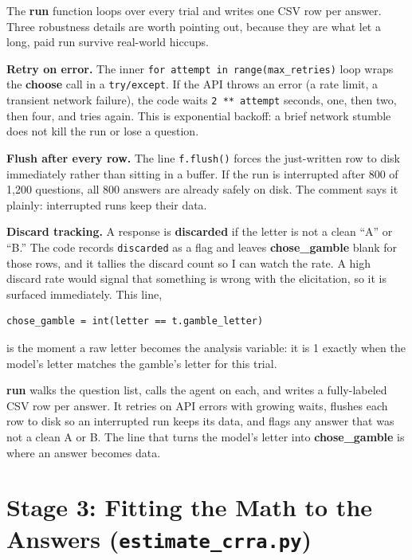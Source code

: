 \documentclass[11pt]{article}
\newcommand{\term}[1]{\textbf{\color{mossdk}#1}}
\newcommand{\file}[1]{\textbf{\ttfamily #1}}
\begin{document}
The \file{run} function loops over every trial and writes one CSV row per answer. Three robustness
details are worth pointing out, because they are what let a long, paid run survive real-world hiccups.

\textbf{Retry on error.} The inner \verb|for attempt in range(max_retries)| loop wraps the
\file{choose} call in a \verb|try/except|. If the API throws an error (a rate limit, a transient
network failure), the code waits \verb|2 ** attempt| seconds, one, then two, then four, and tries
again. This is exponential backoff: a brief network stumble does not kill the run or lose a question.

\textbf{Flush after every row.} The line \verb|f.flush()| forces the just-written row to disk
immediately rather than sitting in a buffer. If the run is interrupted after 800 of 1{,}200 questions,
all 800 answers are already safely on disk. The comment says it plainly: interrupted runs keep their
data.

\textbf{Discard tracking.} A response is \term{discarded} if the letter is not a clean ``A'' or ``B.''
The code records \verb|discarded| as a flag and leaves \file{chose\_gamble} blank for those rows, and
it tallies the discard count so I can watch the rate. A high discard rate would signal that something
is wrong with the elicitation, so it is surfaced immediately. This line,

\begin{lstlisting}[style=sh]
chose_gamble = int(letter == t.gamble_letter)
\end{lstlisting}

is the moment a raw letter becomes the analysis variable: it is 1 exactly when the model's letter
matches the gamble's letter for this trial.

\begin{plainbox}
\file{run} walks the question list, calls the agent on each, and writes a fully-labeled CSV row per
answer. It retries on API errors with growing waits, flushes each row to disk so an interrupted run
keeps its data, and flags any answer that was not a clean A or B. The line that turns the model's
letter into \file{chose\_gamble} is where an answer becomes data.
\end{plainbox}

\section{Stage 3: Fitting the Math to the Answers (\texttt{estimate\_crra.py})}
\end{document}
